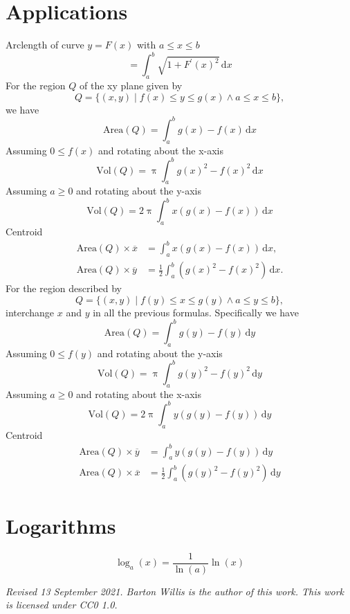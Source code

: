\documentclass[letterpaper,9pt,fleqn]{extarticle}
\begin{document}
\begin{multicols*}{3}
\section*{Applications}
Arclength of curve \(y = F(x)\) with \(a \leq x \leq b\)
\[
   = \int_a^b \sqrt{1 + F^\prime(x)^2} \, \mathrm{d} x
\]
For the region \(Q\) of the xy plane given by
\[
   Q = \{(x,y) \mid f(x) \leq y \leq g(x) \land a \leq x \leq b \},
\]
we have
\[
  \mbox{Area}(Q) = \int_a^b g(x) - f(x) \, \mathrm{d} x
\]  
Assuming \(0 \leq f(x)\) and rotating about the \mbox{x-axis}
\[
  \mbox{Vol}(Q) = \uppi \int_a^b g(x)^2 - f(x)^2 \, \mathrm{d} x
\]
Assuming \(a \geq 0\) and rotating about the y-axis
\[
  \mbox{Vol}(Q) = 2 \uppi \int_a^b x (g(x)  - f(x)) \, \mathrm{d} x
\]
Centroid
\begin{align*}
    \mbox{Area}(Q) \times \overline{x} &=  \int_a^b x \left(g(x) - f(x) \right) \, \mathrm{d} x, \\
     \mbox{Area}(Q) \times \overline{y} &=  \frac{1}{2} \int_a^b  \left (g(x)^2  - f(x)^2 \right) \, \mathrm{d} x.
\end{align*}
For the region described by
\[
   Q = \{(x,y) \mid f(y) \leq x \leq g(y) \land a \leq y \leq b \},
\]
interchange \(x\) and \(y\) in all the previous formulas. Specifically
we have
\[
  \mbox{Area}(Q) = \int_a^b g(y) - f(y) \, \mathrm{d} y
\]  
Assuming \(0 \leq f(y)\) and rotating about the \mbox{y-axis}
\[
  \mbox{Vol}(Q) = \uppi \int_a^b g(y)^2 - f(y)^2 \, \mathrm{d} y
\]
Assuming \(a \geq 0\) and rotating about the x-axis
\[
  \mbox{Vol}(Q) = 2 \uppi \int_a^b y (g(y)  - f(y)) \, \mathrm{d} y
\]
Centroid
\begin{align*}
    \mbox{Area}(Q) \times \overline{y} &=  \int_a^b y \left(g(y) - f(y) \right) \, \mathrm{d} y \\
     \mbox{Area}(Q) \times \overline{x} &=  \frac{1}{2} \int_a^b  \left (g(y)^2  - f(y)^2 \right) \, \mathrm{d} y
\end{align*}

\vspace{-0.25in}

  \section*{Logarithms}
  \vspace{-0.25in}
     \begin{equation*}
    \log_a(x) = \frac{1}{\ln(a)} \ln(x)
       \end{equation*}
       \vspace{-0.35in}

\vspace{-0.60in}


\vfill
\tiny
\noindent \emph{Revised 13 September 2021. Barton Willis is the author of this work. This work is 
licensed under CC0 1.0. }

\end{multicols*}
  
\end{document}
